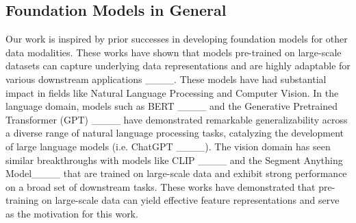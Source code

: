 \subsection{Foundation Models in General}
Our work is inspired by prior successes in developing foundation models for other data modalities. These works have shown that models  pre-trained on large-scale datasets can capture underlying data representations and are highly adaptable for various downstream applications ____. These models have had substantial impact in fields like Natural Language Processing and Computer Vision. In the language domain, models such as BERT ____ and the Generative Pretrained Transformer (GPT) ____ have demonstrated remarkable generalizability across a diverse range of natural language processing tasks, catalyzing the development of large language models (i.e. ChatGPT ____). 
The vision domain has seen similar breakthroughs with models like CLIP ____ and the Segment Anything Model____ that are trained on large-scale data and exhibit strong performance on a broad set of downstream tasks. These works have demonstrated that pre-training on large-scale data can yield effective feature representations and serve as the motivation for this work.
